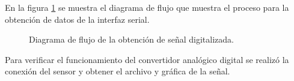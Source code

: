 En la figura \ref{fig:FlujoSerial} se muestra el diagrama de flujo que muestra el proceso para la obtención de datos de la interfaz serial.\\

	\begin{figure}[htbp!]
		\centering
		\caption{Diagrama de flujo de la obtención de señal digitalizada.}
		\label{fig:FlujoSerial}
	\end{figure}
\newpage		
Para verificar el funcionamiento del convertidor analógico digital se realizó la conexión del sensor y obtener el archivo y gráfica de la señal.\\

